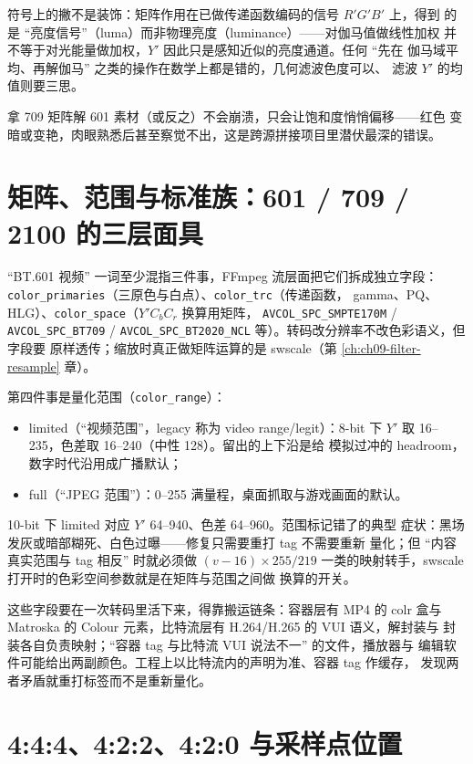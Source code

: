 \documentclass[12pt,a4paper,fontset=fandol]{ctexbook}
\newcommand{\Tp}[1]{\texttt{#1}}
\newcommand{\Bk}{\discretionary{}{}{}}
\begin{document}
符号上的撇不是装饰：矩阵作用在已做传递函数编码的信号 \(R'G'B'\) 上，得到
的是 ``亮度信号''（luma）而非物理亮度（luminance）——对伽马值做线性加权
并不等于对光能量做加权，\(Y'\) 因此只是感知近似的亮度通道。任何 ``先在
伽马域平均、再解伽马'' 之类的操作在数学上都是错的，几何滤波色度可以、
滤波 \(Y'\) 的均值则要三思。

拿 709 矩阵解 601 素材（或反之）不会崩溃，只会让饱和度悄悄偏移——红色
变暗或变艳，肉眼熟悉后甚至察觉不出，这是跨源拼接项目里潜伏最深的错误。

\section{矩阵、范围与标准族：601 / 709 / 2100 的三层面具}

``BT.601 视频'' 一词至少混指三件事，FFmpeg 流层面把它们拆成独立字段：
\Tp{color\_{\Bk}primaries}（三原色与白点）、\Tp{color\_trc}（传递函数，
gamma、PQ、HLG）、\Tp{color\_{\Bk}space}（\(Y'C_bC_r\) 换算用矩阵，
\Tp{AVCOL\_{\Bk}SPC\_{\Bk}SMPTE170M} / \Tp{AVCOL\_{\Bk}SPC\_{\Bk}BT709} /
\Tp{AVCOL\_{\Bk}SPC\_{\Bk}BT2020\_{\Bk}NCL} 等）。转码改分辨率不改色彩语义，但字段要
原样透传；缩放时真正做矩阵运算的是 swscale（第 \ref{ch:ch09-filter-resample}
章）。

第四件事是量化范围（\Tp{color\_range}）：
\begin{itemize}
\item limited（``视频范围''，legacy 称为 video range/legit）：8-bit 下
      \(Y'\) 取 16--235，色差取 16--240（中性 128）。留出的上下沿是给
      模拟过冲的 headroom，数字时代沿用成广播默认；
\item full（``JPEG 范围''）：0--255 满量程，桌面抓取与游戏画面的默认。
\end{itemize}
10-bit 下 limited 对应 \(Y'\) 64--940、色差 64--960。范围标记错了的典型
症状：黑场发灰或暗部糊死、白色过曝——修复只需要重打 tag 不需要重新
量化；但 ``内容真实范围与 tag 相反'' 时就必须做 \((v-16)\times 255/219\)
一类的映射转手，swscale 打开时的色彩空间参数就是在矩阵与范围之间做
换算的开关。

这些字段要在一次转码里活下来，得靠搬运链条：容器层有 MP4 的 colr 盒与
Matroska 的 Colour 元素，比特流层有 H.264/H.265 的 VUI 语义，解封装与
封装各自负责映射；``容器 tag 与比特流 VUI 说法不一'' 的文件，播放器与
编辑软件可能给出两副颜色。工程上以比特流内的声明为准、容器 tag 作缓存，
发现两者矛盾就重打标签而不是重新量化。

\section{4:4:4、4:2:2、4:2:0 与采样点位置}
\end{document}
